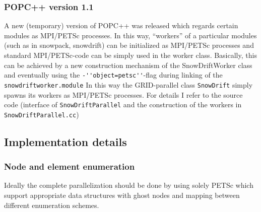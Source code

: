 \documentclass[12pt]{report}
\begin{document}
\subsubsection{POPC++ version 1.1}
A new (temporary) version of POPC++ was released which regards certain
modules as MPI/PETSc processes. In this way, ``workers'' of a
particular modules (such as in snowpack, snowdrift) can be initialized
as MPI/PETSc processes and standard MPI/PETSc-code can be simply used
in the worker class. Basically, this can be achieved by a new
construction mechanism of the SnowDriftWorker class and eventually
using the \verb+-''object=petsc''+-flag during linking of the
\verb+snowdriftworker.module+ In this way the GRID-parallel class
\verb+SnowDrift+ simply spawns its workers as MPI/PETSc processes.
For details I refer to the source code (interface of
\verb+SnowDriftParallel+ and the construction of the workers in
\verb+SnowDriftParallel.cc+)


\subsection{Implementation details}

\subsubsection{Node and element enumeration}
Ideally the complete parallelization should be done by using solely
PETSc which support appropriate data structures with ghost nodes and
mapping between different enumeration schemes.
\end{document}
